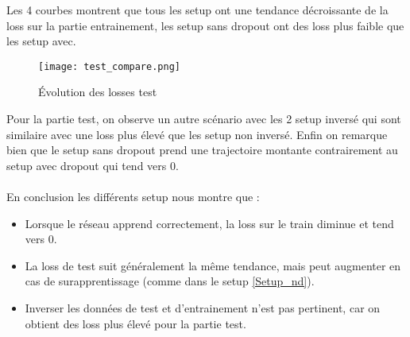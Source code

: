 \documentclass{article}
\begin{document}
Les 4 courbes montrent que tous les setup ont une tendance décroissante de la loss sur la partie entrainement, les setup sans dropout ont des loss plus faible que les setup avec.

\begin{figure}[H]
    \centering
    \texttt{[image: test\_compare.png]}
    \caption{Évolution des losses test}
    \label{fig:test_compare}
\end{figure}

Pour la partie test, on observe un autre scénario avec les 2 setup inversé qui sont similaire avec une loss plus élevé que les setup non inversé. Enfin on remarque bien que le setup sans dropout prend une trajectoire montante contrairement au setup avec dropout qui tend vers 0. \\\\

En conclusion les différents setup nous montre que :

\begin{itemize}
    \item Lorsque le réseau apprend correctement, la loss sur le train diminue et tend vers 0.
    \item La loss de test suit généralement la même tendance, mais peut augmenter en cas de surapprentissage (comme dans le setup \ref{Setup_nd}).
    \item Inverser les données de test et d'entrainement n'est pas pertinent, car on obtient des loss plus élevé pour la partie test.
\end{itemize}
\end{document}
